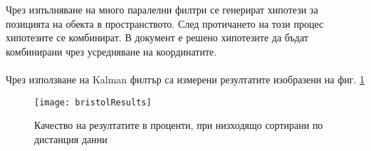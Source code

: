 Чрез изпълняване на много паралелни филтри се генерират хипотези за позицията на обекта в пространството. След протичането на този процес хипотезите се комбинират. В документ \cite{bristolBeacons} е решено хипотезите да бъдат комбинирани чрез усредняване на координатите. \\


 \\
Чрез използване на Kalman филтър са измерени резултатите изобразени на фиг. \ref{fig:bristolResults}

\begin{figure}
    \centering
    \centerline{\texttt{[image: bristolResults]}}
    \caption{Качество на резултатите в проценти, при низходящо сортирани по дистанция данни}
    \label{fig:bristolResults}
\end{figure}